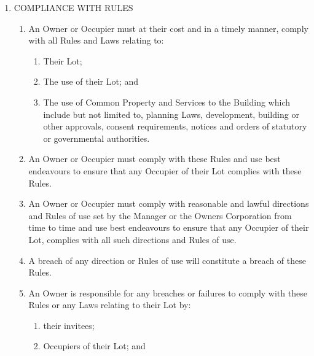 \documentclass{article}
\begin{document}
\begin{enumerate}[label=\arabic*.]
\begin{enumerate}[label=\arabic{enumi}.\arabic*.]
\begin{enumerate}[label=(\arabic*)]
\end{enumerate}

\item  COMPLIANCE WITH RULES

\begin{enumerate}[label=\arabic{enumi}.\arabic*.]

\item  An Owner or Occupier must at their cost and in a timely manner, comply with all Rules and Laws relating to:

\begin{enumerate}[label=(\arabic*)]

\item  Their Lot;

\item  The use of their Lot; and

\item  The use of Common Property and Services to the Building which include but not limited to, planning Laws, development, building or other approvals, consent requirements, notices and orders of statutory or governmental authorities.

\end{enumerate}

\item  An Owner or Occupier must comply with these Rules and use best endeavours to ensure that any Occupier of their Lot complies with these Rules.

\item  An Owner or Occupier must comply with reasonable and lawful directions and Rules of use set by the Manager or the Owners Corporation from time to time and use best endeavours to ensure that any Occupier of their Lot, complies with all such directions and Rules of use.
\newpage



\item  A breach of any direction or Rules of use will constitute a breach of these Rules.

\item  An Owner is responsible for any breaches or failures to comply with these Rules or any Laws relating to their Lot by:

\begin{enumerate}[label=(\arabic*)]

\item  their invitees;

\item  Occupiers of their Lot; and


\end{enumerate}
\end{enumerate}
\end{enumerate}
\end{enumerate}
\end{document}
